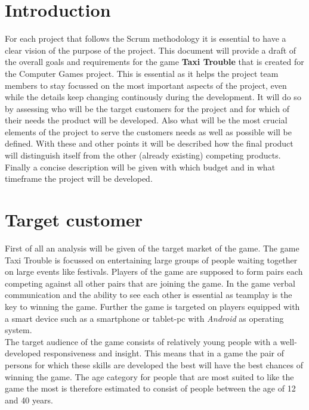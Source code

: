 \documentclass[11pt]{article}
\begin{document}
\section{Introduction}
For each project that follows the Scrum methodology it is essential to have a clear vision of the purpose of the project. This document will provide a draft of the overall goals and requirements for the game \textbf{Taxi Trouble} that is created for the Computer Games project. This is essential as it helps the project team members to stay focussed on the most important aspects of the project, even while the details keep changing continously during the development. It will do so by assessing who will be the target customers for the project and for which of their needs the product will be developed. Also what will be the most crucial elements of the project to serve the customers needs as well as possible will be defined. With these and other points it will be described how the final product will distinguish itself from the other (already existing) competing products. Finally a concise description will be given with which budget and in what timeframe the project will be developed.

\section{Target customer}
First of all an analysis will be given of the target market of the game. The game Taxi Trouble is focussed on entertaining large groups of people waiting together on large events like festivals. Players of the game are supposed to form pairs each competing against all other pairs that are joining the game. In the game verbal communication and the ability to see each other is essential as teamplay is the key to winning the game. Further the game is targeted on players equipped with a smart device such as a smartphone or tablet-pc with \textit{Android} as operating system.\\
The target audience of the game consists of relatively young people with a well-developed responsiveness and insight. This means that in a game the pair of persons for which these skills are developed the best will have the best chances of winning the game. The age category for people that are most suited to like the game the most is therefore estimated to consist of people between the age of 12 and 40 years.
\end{document}
